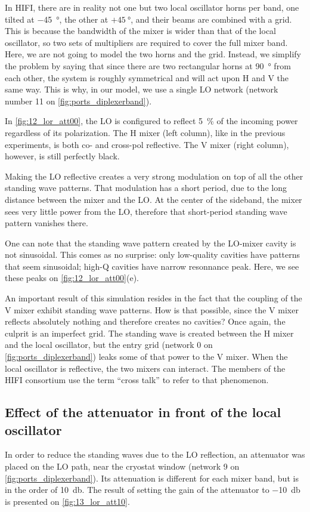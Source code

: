 In HIFI, there are in reality not one but two local oscillator horns per band, one tilted at \SI{-45}{\degree}, the other at $+\SI{45}{\degree}$, and their beams are combined with a grid.
This is because the bandwidth of the mixer is wider than that of the local oscillator, so two sets of multipliers are required to cover the full mixer band.
Here, we are not going to model the two horns and the grid.
Instead, we simplify the problem by saying that since there are two rectangular horns at \SI{90}{\degree} from each other, the system is roughly symmetrical and will act upon H and V the same way.
This is why, in our model, we use a single LO network (network number 11 on \cref{fig:ports_diplexerband}).

In \cref{fig:12_lor_att00}, the LO is configured to reflect \SI{5}{\percent} of the incoming power regardless of its polarization.
The H mixer (left column), like in the previous experiments, is both co- and cross-pol reflective.
The V mixer (right column), however, is still perfectly black.

Making the LO reflective creates a very strong modulation on top of all the other standing wave patterns.
That modulation has a short period, due to the long distance between the mixer and the LO.
At the center of the sideband, the mixer sees very little power from the LO, therefore that short-period standing wave pattern vanishes there.

One can note that the standing wave pattern created by the LO-mixer cavity is not sinusoidal.
This comes as no surprise: only low-quality cavities have patterns that seem sinusoidal;
high-Q cavities have narrow resonnance peak.
Here, we see these peaks on \cref{fig:12_lor_att00}(e).

An important result of this simulation resides in the fact that the coupling of the V mixer exhibit standing wave patterns.
How is that possible, since the V mixer reflects absolutely nothing and therefore creates no cavities?
Once again, the culprit is an imperfect grid.
The standing wave is created between the H mixer and the local oscillator, but the entry grid (network 0 on \cref{fig:ports_diplexerband}) leaks some of that power to the V mixer.
When the local oscillator is reflective, the two mixers can interact.
The members of the HIFI consortium use the term ``cross talk'' to refer to that phenomenon.

\clearpage
\subsection{Effect of the attenuator in front of the local oscillator}
In order to reduce the standing waves due to the LO reflection, an attenuator was placed on the LO path, near the cryostat window (network 9 on \cref{fig:ports_diplexerband}).
Its attenuation is different for each mixer band, but is in the order of \SI{10}{\decibel}.
The result of setting the gain of the attenuator to \SI{-10}{\decibel} is presented on \cref{fig:13_lor_att10}.

